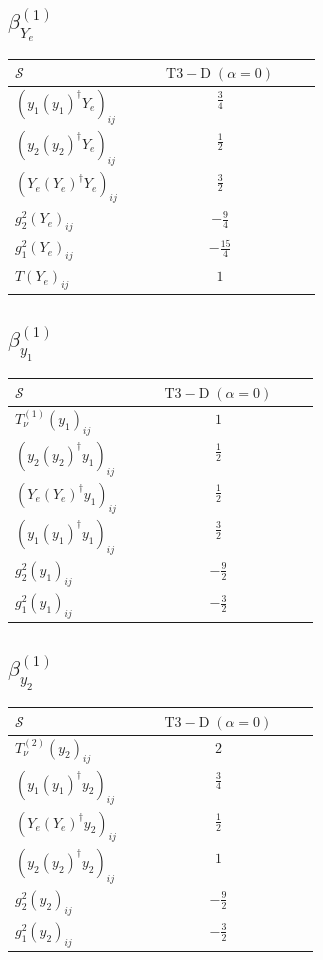 \documentclass[9pt]{article}
\begin{document}
\subsection*{$ \beta_{Y_e}^{(1)} $}
\begin{longtable}{@{}p{0.38\linewidth}c@{}}
\toprule
$\mathcal{S}$ & $ \mathrm{T3-D}\;(\alpha=0) $ \\
\midrule
$ (y_1 (y_1)^{\dagger} Y_e)_{ij} $ & $ \frac{3}{4} $ \\
$ (y_2 (y_2)^{\dagger} Y_e)_{ij} $ & $ \frac{1}{2} $ \\
$ (Y_e (Y_e)^{\dagger} Y_e)_{ij} $ & $ \frac{3}{2} $ \\
$ g_2^2 (Y_e)_{ij} $ & $ - \frac{9}{4} $ \\
$ g_1^2 (Y_e)_{ij} $ & $ - \frac{15}{4} $ \\
$ T (Y_e)_{ij} $ & $ 1 $ \\
\bottomrule
\end{longtable}
\subsection*{$ \beta_{y_1}^{(1)} $}
\begin{longtable}{@{}p{0.38\linewidth}c@{}}
\toprule
$\mathcal{S}$ & $ \mathrm{T3-D}\;(\alpha=0) $ \\
\midrule
$ T_{\nu}^{(1)} (y_1)_{ij} $ & $ 1 $ \\
$ (y_2 (y_2)^{\dagger} y_1)_{ij} $ & $ \frac{1}{2} $ \\
$ (Y_e (Y_e)^{\dagger} y_1)_{ij} $ & $ \frac{1}{2} $ \\
$ (y_1 (y_1)^{\dagger} y_1)_{ij} $ & $ \frac{3}{2} $ \\
$ g_2^2 (y_1)_{ij} $ & $ - \frac{9}{2} $ \\
$ g_1^2 (y_1)_{ij} $ & $ - \frac{3}{2} $ \\
\bottomrule
\end{longtable}
\subsection*{$ \beta_{y_2}^{(1)} $}
\begin{longtable}{@{}p{0.38\linewidth}c@{}}
\toprule
$\mathcal{S}$ & $ \mathrm{T3-D}\;(\alpha=0) $ \\
\midrule
$ T_{\nu}^{(2)} (y_2)_{ij} $ & $ 2 $ \\
$ (y_1 (y_1)^{\dagger} y_2)_{ij} $ & $ \frac{3}{4} $ \\
$ (Y_e (Y_e)^{\dagger} y_2)_{ij} $ & $ \frac{1}{2} $ \\
$ (y_2 (y_2)^{\dagger} y_2)_{ij} $ & $ 1 $ \\
$ g_2^2 (y_2)_{ij} $ & $ - \frac{9}{2} $ \\
$ g_1^2 (y_2)_{ij} $ & $ - \frac{3}{2} $ \\
\bottomrule
\end{longtable}
\end{document}
